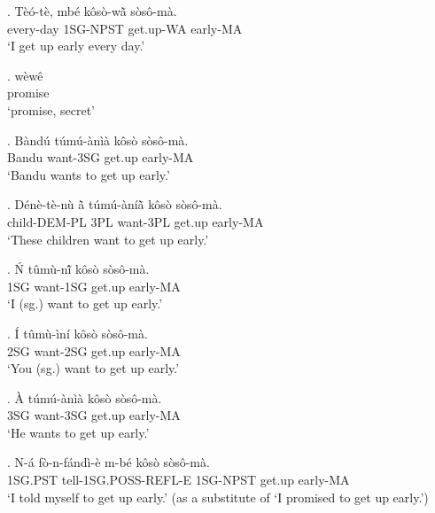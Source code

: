 \documentclass{assets/fieldnotes}
\begin{document}


\exg. T\`{e}\'{o}-t\`{e}, mb\'{e} k\^{o}s\`{o}-wã̀ s\`{o}s\^{o}-m\`{a}. \\ 
every-day 1SG-NPST get.up-WA early-MA \\
`I get up early every day.'

\exg. w\`{e}w\^{e} \\
promise \\
`promise, secret'






\exg. B\`{a}nd\'{u} t\'{u}m\'{u}-\`{a}n\`{i}\`{a} k\^{o}s\`{o} s\`{o}s\^{o}-m\`{a}. \\
Bandu want-3SG get.up early-MA \\
`Bandu wants to get up early.'


\exg. D\'{e}n\`{e}-t\`{e}-n\`{u} ã̀  t\'{u}m\'{u}-\`{a}n\'{i}ã̀  k\^{o}s\`{o} s\`{o}s\^{o}-m\`{a}. \\
child-DEM-PL 3PL want-3PL get.up early-MA \\
`These children want to get up early.'

\exg. \'{N} t\^{u}m\`{u}-nĩ́  k\^{o}s\`{o} s\`{o}s\^{o}-m\`{a}. \\
1SG want-1SG get.up early-MA \\
`I (sg.) want to get up early.'

\exg. \'{I} t\^{u}m\`{u}-\`{i}n\'{i} k\^{o}s\`{o} s\`{o}s\^{o}-m\`{a}. \\
2SG want-2SG get.up early-MA \\
`You (sg.) want to get up early.'

\exg. \`{A} t\'{u}m\'{u}-\`{a}n\`{i}\`{a} k\^{o}s\`{o} s\`{o}s\^{o}-m\`{a}. \\
3SG want-3SG get.up early-MA \\
`He wants to get up early.'


\exg. N-\'{a} f\`{o}-n-f\'{a}nd\`{i}-\`{e} m-b\'{e} k\^{o}s\`{o} s\`{o}s\^{o}-m\`{a}. \\
1SG.PST tell-1SG.POSS-REFL-E 1SG-NPST get.up early-MA \\
`I told myself to get up early.' (as a substitute of `I promised to get up early.')
\end{document}
